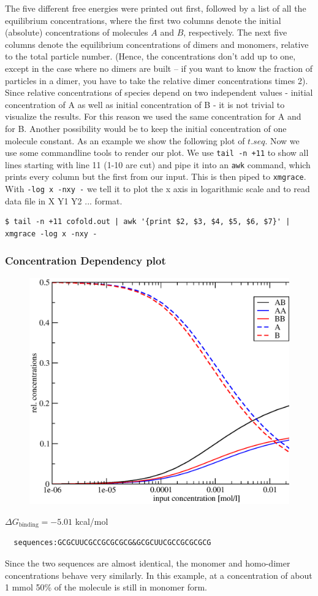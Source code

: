 \documentclass[a4paper]{article}
\newcommand{\frametitle}[1]{\subsubsection{#1}}
\begin{document}
\noindent
The five different free energies were printed out first, followed
by a list of all the equilibrium concentrations, where the first two columns denote the initial
(absolute) concentrations of molecules $A$ and $B$, respectively. The next
five columns denote the equilibrium concentrations of dimers and monomers,
relative to the total particle number. (Hence, the concentrations don't add
up to one, except in the case where no dimers are built -- if you want to
know the fraction of particles in a dimer, you have to take the relative
dimer concentrations times 2).\\
Since relative concentrations of species depend on two independent values -
initial concentration of A as well as initial concentration of B - it is not
trivial to visualize the results. For this reason we used the same concentration
for A and for B. Another possibility would be to keep the initial concentration of
one molecule constant.
As an example we show the following plot of
$t.seq$.
Now we use some commandline tools to render our plot. We use \texttt{tail -n +11} to
show all lines starting with line 11 (1-10 are cut) and pipe it into an \texttt{awk} command, which
prints every column but the first from our input.
This is then piped to \texttt{xmgrace}.
With \texttt{-log x -nxy -} we tell it to plot the x axis in logarithmic scale and to read data file in X Y1 Y2 ... format.

\begin{verbatim}
$ tail -n +11 cofold.out | awk '{print $2, $3, $4, $5, $6, $7}' | xmgrace -log x -nxy -
\end{verbatim}	

\frametitle{Concentration Dependency plot}
\begin{center} 
\begin{figure}[h]
\includegraphics[trim= 0cm 0cm 0cm -2.2cm,width=.70\textwidth]{Figures/tconcdep.eps}\hfill
\end{figure}
\end{center}
  $\Delta G_{\text{binding}}=-5.01$ kcal/mol
\begin{verbatim}
  sequences:GCGCUUCGCCGCGCGCG&GCGCUUCGCCGCGCGCG
\end{verbatim}
Since the two sequences are almost identical, the monomer and homo-dimer
concentrations behave very similarly. 
In this example, at a concentration of about 1 mmol 50\% of the molecule
is still in monomer form. 
\end{document}
